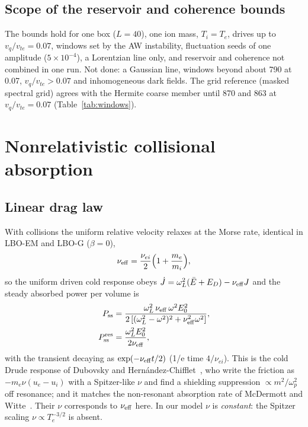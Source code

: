 \documentclass[aps,pre,reprint,floatfix,amsmath,amssymb,nofootinbib,superscriptaddress]{revtex4-2}
\newcommand{\vq}{v_q/v_{te}}
\begin{document}
\subsection{Scope of the reservoir and coherence bounds}
The bounds hold for one box ($L=40$), one ion mass, $T_i=T_e$, drives up to $\vq=0.07$, windows set by the AW instability, fluctuation seeds of one amplitude ($5\times10^{-4}$), a Lorentzian line only, and reservoir and coherence not combined in one run. Not done: a Gaussian line, windows beyond about 790 at 0.07, $\vq>0.07$ and inhomogeneous dark fields. The grid reference (masked spectral grid) agrees with the Hermite coarse member until 870 and 863 at $\vq=0.07$ (Table~\ref{tab:windows}).


\section{Nonrelativistic collisional absorption}\label{sec:r2}
\subsection{Linear drag law}
With collisions the uniform relative velocity relaxes at the Morse rate, identical in LBO-EM and LBO-G ($\beta=0$),
\begin{equation}
\nu_{\rm eff}=\frac{\nu_{ei}}{2}\Big(1+\frac{m_e}{m_i}\Big),
\end{equation}
so the uniform driven cold response obeys $\dot J=\omega_L^2(\bar E+E_D)-\nu_{\rm eff}J$ and the steady absorbed power per volume is
\begin{align}
P_{\rm ss}&=\frac{\omega_L^2\,\nu_{\rm eff}\,\omega^2E_0^2}{2\left[(\omega_L^2-\omega^2)^2+\nu_{\rm eff}^2\omega^2\right]},\\
P_{\rm ss}^{\rm res}&=\frac{\omega_L^2E_0^2}{2\nu_{\rm eff}},
\end{align}
with the transient decaying as $\exp(-\nu_{\rm eff}t/2)$ (1/e time $4/\nu_{ei}$). This is the cold Drude response of Dubovsky and Hern\'andez-Chifflet~\cite{DubovskyHC2015}, who write the friction as $-m_e\nu(u_e-u_i)$ with a Spitzer-like $\nu$ and find a shielding suppression $\propto m^2/\omega_p^2$ off resonance; and it matches the non-resonant absorption rate of McDermott and Witte~\cite{McDermottWitte2020}. Their $\nu$ corresponds to $\nu_{\rm eff}$ here. In our model $\nu$ is \emph{constant}: the Spitzer scaling $\nu\propto T_e^{-3/2}$ is absent.
\end{document}
